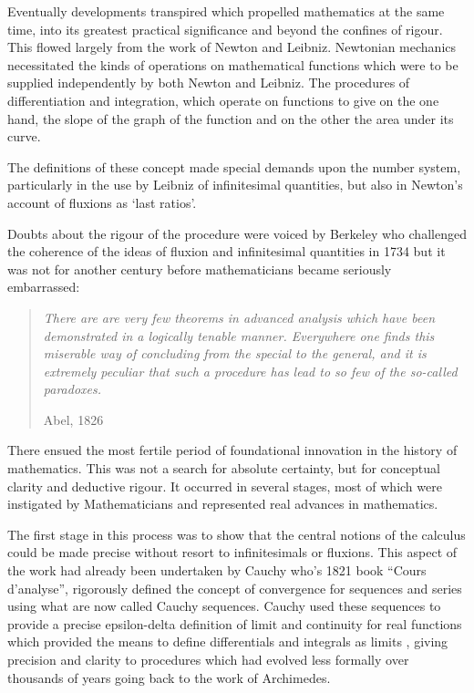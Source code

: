 \documentclass[10pt,titlepage]{book}
\begin{document}
Eventually developments transpired which propelled mathematics at the same time, into its greatest practical significance and beyond the confines of rigour.
This flowed largely from the work of Newton and Leibniz.
Newtonian mechanics necessitated the kinds of operations on mathematical functions which were to be supplied independently by both Newton and Leibniz.
The procedures of differentiation and integration, which operate on functions to give on the one hand, the slope of the graph of the function and on the other the area under its curve.

The definitions of these concept made special demands upon the number system, particularly in the use by Leibniz of infinitesimal quantities, but also in Newton's account of fluxions as `last ratios'.

Doubts about the rigour of the procedure were voiced by Berkeley
who challenged the coherence of the ideas of fluxion and infinitesimal quantities\cite{berkeley2018analyst} in 1734 but it was not for another century before mathematicians became seriously embarrassed:

\begin{quotation}
  \emph{There are are very few theorems in advanced analysis which have been demonstrated in a logically tenable manner. Everywhere one finds this miserable way of concluding from the special to the general, and it is extremely peculiar that such a procedure has lead to so few of the so-called paradoxes.}

Abel, 1826
\end{quotation}

There ensued the most fertile period of foundational innovation in the history of mathematics.
This was not a search for absolute certainty, but for conceptual clarity and deductive rigour.
It occurred in several stages, most of which were instigated by Mathematicians and represented real advances in mathematics.

The first stage in this process was to show that the central notions of the calculus could be made precise without resort to infinitesimals or fluxions.
This aspect of the work had already been undertaken by Cauchy who's 1821 book ``Cours d'analyse''\cite{bradley2010cauchy}, rigorously defined the concept of convergence for sequences and series using what are now called Cauchy sequences.
Cauchy used these sequences to provide a precise epsilon-delta definition of limit and continuity for real functions which provided the means to  define differentials and integrals as limits \cite{cates2019cauchy}, giving precision and clarity to procedures which had evolved less formally over thousands of years going back to the work of Archimedes.
\end{document}
